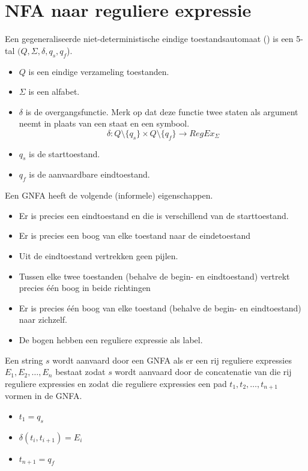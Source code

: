 \documentclass[main.tex]{subfiles}
\begin{document}
\section{NFA naar reguliere expressie}
\begin{de}
  Een gegeneraliseerde niet-deterministische eindige toestandsautomaat () is een 5-tal $(Q,\Sigma,\delta,q_{s},q_{f}$).
  \begin{itemize}
  \item $Q$ is een eindige verzameling toestanden.
  \item $\Sigma$ is een alfabet.
  \item $\delta$ is de overgangsfunctie.
  Merk op dat deze functie twee staten als argument neemt in plaats van een staat en een symbool.
    \[
    \delta: Q\setminus\{q_{s}\} \times Q\setminus\{q_{f}\} \rightarrow RegEx_{\Sigma}
    \]
  \item $q_{s}$ is de starttoestand.
  \item $q_{f}$ is de aanvaardbare eindtoestand.
  \end{itemize}
  Een GNFA heeft de volgende (informele) eigenschappen.
  \begin{itemize}
  \item Er is precies een eindtoestand en die is verschillend van de starttoestand.
  \item Er is precies een boog van elke toestand naar de eindetoestand
  \item Uit de eindtoestand vertrekken geen pijlen.
  \item Tussen elke twee toestanden (behalve de begin- en eindtoestand) vertrekt precies \'e\'en boog in beide richtingen
  \item Er is precies \'e\'en boog van elke toestand (behalve de begin- en eindtoestand) naar zichzelf.
  \item De bogen hebben een reguliere expressie als label.
  \end{itemize}
\end{de}

\begin{de}
  Een string $s$ wordt aanvaard door een GNFA als er een rij reguliere expressies $E_{1},E_{2},\dotsc,E_{n}$ bestaat zodat $s$ wordt aanvaard door de concatenatie van die rij reguliere expressies en zodat die reguliere expressies een pad $t_{1},t_{2},\dotsc,t_{n+1}$ vormen in de GNFA. 
  \begin{itemize}
  \item $t_{1} = q_{s}$
  \item $\delta(t_{i},t_{i+1}) = E_{i}$
  \item $t_{n+1} = q_{f}$
  \end{itemize}
\end{de}
\end{document}
